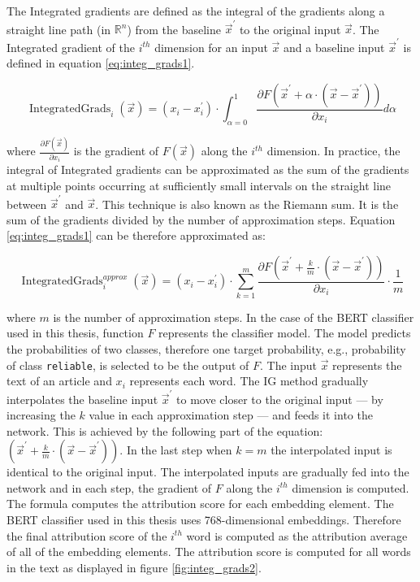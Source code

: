 The Integrated gradients are defined as the integral of the gradients along a straight line path (in $\mathbb{R}^n$) from the baseline $\Vec{x}^{'}$ to the original input $\Vec{x}$. The Integrated gradient of the $i^{th}$ dimension for an input $\Vec{x}$ and a baseline input $\Vec{x}^{'}$ is defined in equation \ref{eq:integ_grads1}.

\begin{equation}
    \operatorname{IntegratedGrads}_i(\Vec{x}) = (x_i - x^{'}_i) \cdot \int_{\alpha = 0}^{1} \displaystyle{\frac{\partial F(\Vec{x}^{'} + \alpha \cdot (\Vec{x}-\Vec{x}^{'}))}{\partial x_i}} d\alpha
    \label{eq:integ_grads1}
\end{equation}

where $\frac{\partial F(\Vec{x})}{\partial x_i}$ is the gradient of $F(\Vec{x})$ along the $i^{th}$ dimension. In practice, the integral of Integrated gradients can be approximated as the sum of the gradients at multiple points occurring at sufficiently small intervals on the straight line between $\Vec{x}^{'}$ and $\Vec{x}$. This technique is also known as the Riemann sum. It is the sum of the gradients divided by the number of approximation steps. Equation \ref{eq:integ_grads1} can be therefore approximated as:

\begin{equation}
    \operatorname{IntegratedGrads}^{approx}_i(\Vec{x}) = (x_i - x^{'}_i) \cdot \sum_{k=1}^{m} \displaystyle{\frac{\partial F(\Vec{x}^{'} + \frac{k}{m} \cdot (\Vec{x} - \Vec{x}^{'}))}{\partial x_i}} \cdot \frac{1}{m}
    \label{eq:integ_grads2}
\end{equation}

where $m$ is the number of approximation steps. In the case of the BERT classifier used in this thesis, function $F$ represents the classifier model. The model predicts the probabilities of two classes, therefore one target probability, e.g., probability of class \texttt{reliable}, is selected to be the output of $F$. The input $\Vec{x}$ represents the text of an article and $x_i$ represents each word. The IG method gradually interpolates the baseline input $\Vec{x}^{'}$ to move closer to the original input --- by increasing the $k$ value in each approximation step --- and feeds it into the network. This is achieved by the following part of the equation: $(\Vec{x}^{'} + \frac{k}{m} \cdot (\Vec{x} - \Vec{x}^{'}))$.
In the last step when $k=m$ the interpolated input is identical to the original input. The interpolated inputs are gradually fed into the network and in each step, the gradient of $F$ along the $i^{th}$ dimension is computed. 
The formula computes the attribution score for each embedding element. The BERT classifier used in this thesis uses 768-dimensional embeddings. Therefore the final attribution score of the $i^{th}$ word is computed as the attribution average of all of the embedding elements. The attribution score is computed for all words in the text as displayed in figure \ref{fig:integ_grads2}.

